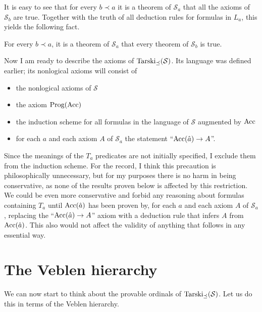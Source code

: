 \documentclass{amsart}
\begin{document}
It is easy to see that for every $b \prec a$ it is a theorem of $\mathcal{S}_a$ that all the axioms of
$\mathcal{S}_b$ are true. Together with the truth of all deduction rules for formulas in $L_a$, this yields
the following fact.

\begin{prop}\label{provetrue}
For every $b \prec a$, it is a theorem of $\mathcal{S}_a$ that every theorem of $\mathcal{S}_b$ is true.
\end{prop}

Now I am ready to describe the axioms of ${\rm Tarski}_{\preceq}(\mathcal{S})$. Its language was
defined earlier; its nonlogical axioms will consist of

\begin{itemize}
\item the nonlogical axioms of $\mathcal{S}$

\item the axiom ${\rm Prog}({\rm Acc})$

\item the induction scheme for all formulas in the language of $\mathcal{S}$ augmented by ${\rm Acc}$

\item for each $a$ and each axiom $A$ of $\mathcal{S}_a$ the statement ``${\rm Acc}(\hat{a}) \to A$''.
\end{itemize}

\noindent Since the meanings of the $T_a$ predicates are not initially specified, I exclude them
from the induction scheme. For the record, I think this precaution is philosophically unnecessary, but for my
purposes there is no harm in being conservative, as none of the results proven below is affected by this restriction.
We could be even more conservative and forbid any reasoning about formulas containing $T_a$ until
${\rm Acc}(\hat{a})$ has been proven by, for each $a$ and each axiom $A$ of $\mathcal{S}_a$, replacing
the ``${\rm Acc}(\hat{a}) \to A$'' axiom with a deduction rule that infers $A$ from ${\rm Acc}(\hat{a})$.
This also would not affect the validity of anything that follows in any essential way.

\section{The Veblen hierarchy}

We can now start to think about the provable ordinals of ${\rm Tarski}_{\preceq}(\mathcal{S})$. Let us
do this in terms of the Veblen hierarchy.
\end{document}
